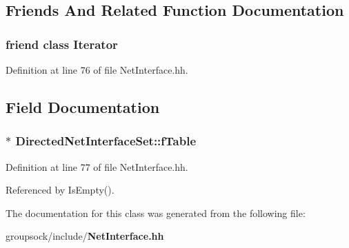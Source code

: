 \subsection{Friends And Related Function Documentation}
\subsubsection[{Iterator}]{\setlength{\rightskip}{0pt plus 5cm}friend class {\bf Iterator}\hspace{0.3cm}{\ttfamily [friend]}}\label{classDirectedNetInterfaceSet_a9830fc407400559db7e7783cc10a9394}


Definition at line 76 of file Net\+Interface.\+hh.



\subsection{Field Documentation}
\subsubsection[{f\+Table}]{$\ast$ Directed\+Net\+Interface\+Set\+::f\+Table\hspace{0.3cm}{\ttfamily [private]}}\label{classDirectedNetInterfaceSet_afc18ef3a2a27b7aedeeede18610c436c}


Definition at line 77 of file Net\+Interface.\+hh.



Referenced by Is\+Empty().



The documentation for this class was generated from the following file\+:\begin{DoxyCompactItemize}
\item 
groupsock/include/{\bf Net\+Interface.\+hh}\end{DoxyCompactItemize}
